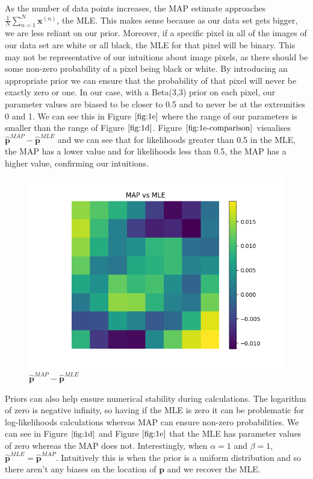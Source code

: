 \documentclass[12pt]{article}
\begin{document}
\begin{enumerate}
As the number of data points increases, the MAP estimate approaches $\frac{1}{N}\sum_{n=1}^{N} \textbf{x}^{(n)}$, the MLE. This makes sense because as our data set gets bigger, we are less reliant on our prior.
Moreover, if a specific pixel in all of the images of our data set are white or all black, the MLE for that pixel will be binary.
This may not be representative of our intuitions about image pixels, as there should be some non-zero probability of a pixel being black or white.
By introducing an appropriate prior we can ensure that the probability of that pixel will never be exactly zero or one.
In our case, with a Beta(3,3) prior on each pixel, our parameter values are biased to be closer to 0.5 and to never be at the extremities 0 and 1.
We can see this in Figure $\ref{fig:1e}$ where the range of our parameters is smaller than the range of Figure $\ref{fig:1d}$.
Figure $\ref{fig:1e-comparison}$ visualises $\hat{\textbf{p}}^{MAP}-\hat{\textbf{p}}^{MLE}$ and we can see that for likelihoods greater than 0.5 in the MLE, the MAP has a lower value and for likelihoods less than 0.5, the MAP has a higher value, confirming our intuitions.

  \begin{figure}[h]
  \centering
  \includegraphics[scale=0.4]{outputs/q1/q1e-mle-vs-map}
  \caption{$\hat{\textbf{p}}^{MAP}-\hat{\textbf{p}}^{MLE}$}
  \label{fig:1e-comparison}
  \end{figure}

Priors can also help ensure numerical stability during calculations.
The logarithm of zero is negative infinity, so having if the MLE is zero it can be problematic for log-likelihoods calculations whereas MAP can ensure non-zero probabilities.
We can see in Figure $\ref{fig:1d}$ and Figure $\ref{fig:1e}$ that the MLE has parameter values of zero whereas the MAP does not.
Interestingly, when $\alpha=1$ and $\beta=1$, $\hat{\textbf{p}}^{MLE} = \hat{\textbf{p}}^{MAP}$.
Intuitively this is when the prior is a uniform distribution and so there aren't any biases on the location of $\textbf{p}$ and we recover the MLE.


\end{enumerate}
\end{document}
